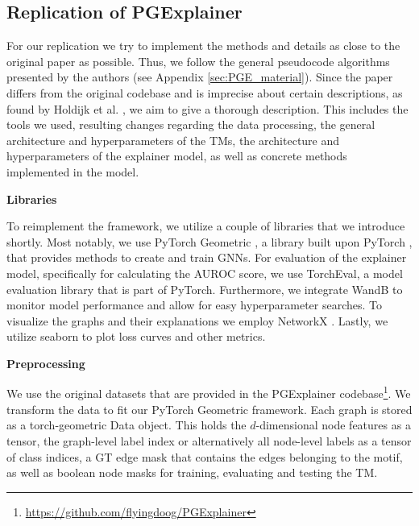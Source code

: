 \subsection{Replication of PGExplainer}
\label{sec:Replication_of_PGExplainer}

For our replication we try to implement the methods and details as close to the original paper as possible. Thus, we follow the general pseudocode algorithms presented by the authors (see Appendix \ref{sec:PGE_material}). Since the paper differs from the original codebase and is imprecise about certain descriptions, as found by Holdijk et al. \cite{holdijk2021re}, we aim to give a thorough description. This includes the tools we used, resulting changes regarding the data processing, the general architecture and hyperparameters of the \acp{TM}, the architecture and hyperparameters of the explainer model, as well as concrete methods implemented in the model. \bigskip

\textbf{Libraries}\par
 To reimplement the framework, we utilize a couple of libraries that we introduce shortly. Most notably, we use PyTorch Geometric \cite{Fey/Lenssen/2019}, a library built upon PyTorch \cite{paszke2019pytorch}, that provides methods to create and train GNNs. For evaluation of the explainer model, specifically for calculating the AUROC score, we use TorchEval, a model evaluation library that is part of PyTorch. Furthermore, we integrate WandB \cite{wandb} to monitor model performance and allow for easy hyperparameter searches. To visualize the graphs and their explanations we employ NetworkX \cite{SciPyProceedings_11}. Lastly, we utilize seaborn \cite{Waskom2021} to plot loss curves and other metrics.\bigskip

\textbf{Preprocessing}\par
We use the original datasets that are provided in the PGExplainer codebase\footnote{\url{https://github.com/flyingdoog/PGExplainer}}. We transform the data to fit our PyTorch Geometric framework. Each graph is stored as a torch-geometric Data object. This holds the $d$-dimensional node features as a tensor, the graph-level label index or alternatively all node-level labels as a tensor of class indices, a \ac{GT} edge mask that contains the edges belonging to the motif, as well as boolean node masks for training, evaluating and testing the \ac{TM}. 
 
